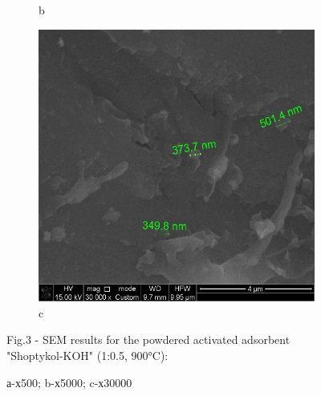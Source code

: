 \begin{figure}[H]
\begin{subfigure}[b]{0.32\textwidth}
        \caption*{b}
    \end{subfigure}
    \hfill
    \begin{subfigure}[b]{0.32\textwidth}
        \centering
        \includegraphics[width=\textwidth,height=\textwidth]{media/chem2/image17}
        \caption*{c}
    \end{subfigure}
    \caption*{Fig.3 - SEM results for the powdered activated adsorbent "Shoptykol-KOH" (1:0.5, 900°C):}
    \caption*{а-х500; b-х5000; c-х30000}
\end{figure}

